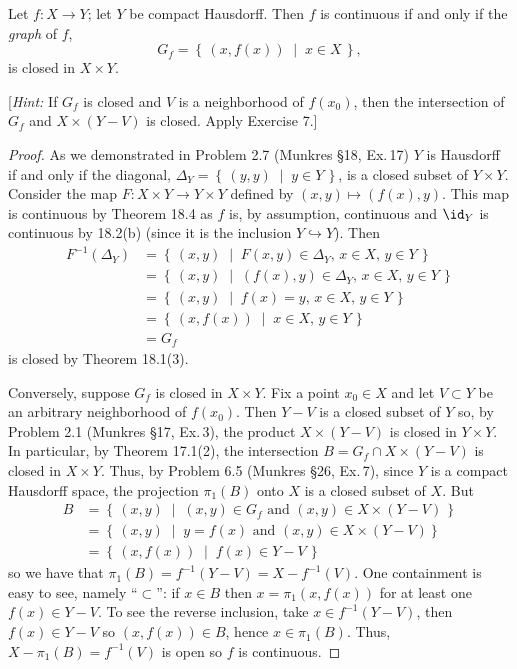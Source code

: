 \begin{problem}[Munkres \S26, Ex.\,8]
\begin{theorem*}
Let $f\colon X\to Y$; let $Y$ be compact Hausdorff. Then $f$ is
continuous if and only if the \emph{graph} of $f$,
\[
G_f=\left\{\,(x,f(x))\;\middle|\;x\in X\,\right\},
\]
is closed in $X\times Y$.
\end{theorem*}
[\emph{Hint:} If $G_f$ is closed and $V$ is a neighborhood of
$f(x_0)$, then the intersection of $G_f$ and $X\times(Y-V)$ is
closed. Apply Exercise 7.]
\end{problem}
\begin{proof}
As we demonstrated in Problem 2.7 (Munkres \S18, Ex.\,17) $Y$ is
Hausdorff if and only if the diagonal,
$\Delta_Y=\left\{\,(y,y)\;\middle|\;y\in Y\,\right\}$, is a closed
subset of $Y\times Y$. Consider the map $F\colon X\times Y\to Y\times
Y$ defined by $(x,y)\mapsto (f(x),y)$. This map is continuous by
Theorem 18.4 as $f$ is, by assumption, continuous and $\id_Y$ is
continuous by 18.2(b) (since it is the inclusion $Y\hookrightarrow
Y$). Then
\begin{align*}
F^{-1}(\Delta_Y)
&=\left\{\,(x,y)\;\middle|\;\text{$F(x,y)\in\Delta_Y$, $x\in X$, $y\in
  Y$}\,\right\}\\
&=\left\{\,(x,y)\;\middle|\;\text{$(f(x),y)\in\Delta_Y$, $x\in X$,
  $y\in Y$}\,\right\}\\
&=\left\{\,(x,y)\;\middle|\;\text{$f(x)=y$, $x\in X$, $y\in Y$}\,\right\}\\
&=\left\{\,(x,f(x))\;\middle|\;\text{$x\in X$, $y\in Y$}\,\right\}\\
&=G_f
\end{align*}
is closed by Theorem 18.1(3).

Conversely, suppose $G_f$ is closed in $X\times Y$. Fix a point
$x_0\in X$ and let $V\subset Y$ be an arbitrary neighborhood of
$f(x_0)$. Then $Y-V$ is a closed subset of $Y$ so, by Problem 2.1
(Munkres \S17, Ex.\,3), the product $X\times (Y-V)$ is closed in
$Y\times Y$. In particular, by Theorem 17.1(2), the intersection
$B=G_f\cap X\times(Y-V)$ is closed in $X\times Y$. Thus, by Problem
6.5 (Munkres \S26, Ex.\,7), since $Y$ is a compact Hausdorff space,
the projection $\pi_1(B)$ onto $X$ is a closed subset of $X$. But
\begin{align*}
B
&=\left\{\,(x,y)\;\middle|\;\text{$(x,y)\in G_f$ and $(x,y)\in X\times
  (Y-V)$}\,\right\}\\
&=\left\{\,(x,y)\;\middle|\;\text{$y=f(x)$ and $(x,y)\in X\times
  (Y-V)$}\right\}\\
&=\left\{\,(x,f(x))\;\middle|\;f(x)\in Y-V\,\right\}
\end{align*}
so we have that $\pi_1(B)=f^{-1}(Y-V)=X-f^{-1}(V)$. One
containment is easy to see, namely ``$\subset$'': if $x\in B$ then
$x=\pi_1(x,f(x))$ for at least one $f(x)\in Y-V$. To see the reverse
inclusion, take $x\in f^{-1}(Y-V)$, then $f(x)\in Y-V$ so $(x,f(x))\in
B$, hence $x\in\pi_1(B)$. Thus, $X-\pi_1(B)=f^{-1}(V)$ is open
so $f$ is continuous.
\end{proof}
